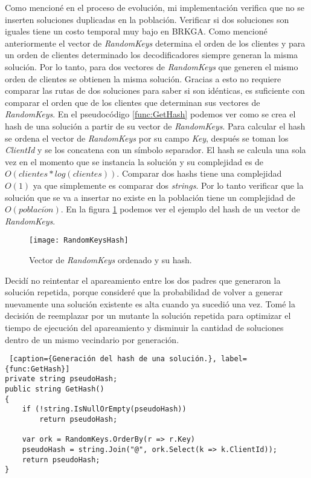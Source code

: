 \bigskip

Como mencioné en el proceso de evolución, mi implementación verifica que no se inserten soluciones duplicadas en la población. Verificar si dos soluciones son iguales tiene un costo temporal muy bajo en BRKGA. Como mencioné anteriormente el vector de \textit{RandomKeys} determina el orden de los clientes y para un orden de clientes determinado los decodificadores siempre generan la misma solución. Por lo tanto, para dos vectores de \textit{RandomKeys} que generen el mismo orden de clientes se obtienen la misma solución. Gracias a esto no requiere comparar las rutas de dos soluciones para saber si son idénticas, es suficiente con comparar el orden que de los clientes que determinan sus vectores de \textit{RandomKeys}. En el pseudocódigo \ref{func:GetHash} podemos ver como se crea el hash de una solución a partir de su vector de \textit{RandomKeys}. Para calcular el hash se ordena el vector de \textit{RandomKeys} por su campo \textit{Key}, después se toman los \textit{ClientId} y se los concatena con un símbolo separador. El hash se calcula una sola vez en el momento que se instancia la solución y su complejidad es de $O(clientes * log(clientes))$. Comparar dos hashs tiene una complejidad $O(1)$ ya que simplemente es comparar dos \textit{strings}. Por lo tanto verificar que la solución que se va a insertar no existe en la población tiene un complejidad de $O(poblaci\acute{o}n)$. En la figura \ref{fig:RandomKeysHash} podemos ver el ejemplo del hash de un vector de \textit{RandomKeys}.

\bigskip

\begin{figure}[h]
	\caption{Vector de \textit{RandomKeys} ordenado y su hash.}
	\centering
	\texttt{[image: RandomKeysHash]}
	\label{fig:RandomKeysHash}
\end{figure}

\bigskip

Decidí no reintentar el apareamiento entre los dos padres que generaron la solución repetida, porque consideré que la probabilidad de volver a generar nuevamente una solución existente es alta cuando ya sucedió una vez. Tomé la decisión de reemplazar por un mutante la solución repetida para optimizar el tiempo de ejecución del apareamiento y disminuir la cantidad de soluciones dentro de un mismo vecindario por generación.

\bigskip

\begin{minipage}{\textwidth}
\begin{lstlisting} [caption={Generación del hash de una solución.}, label={func:GetHash}]
private string pseudoHash;
public string GetHash()
{
	if (!string.IsNullOrEmpty(pseudoHash))
		return pseudoHash;
		
	var ork = RandomKeys.OrderBy(r => r.Key)
	pseudoHash = string.Join("@", ork.Select(k => k.ClientId));
	return pseudoHash;
}
\end{lstlisting}
\end{minipage}

